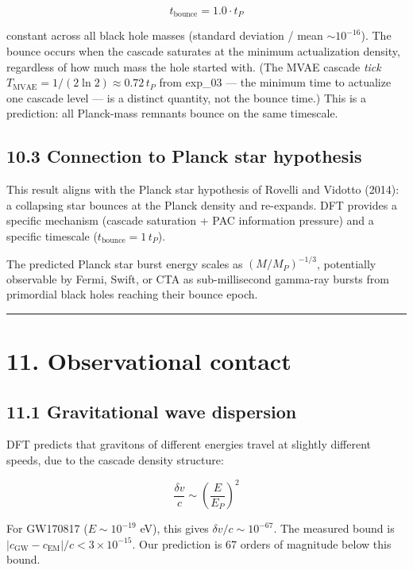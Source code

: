 \documentclass[11pt,a4paper]{article}
\begin{document}
\[t_{\text{bounce}} = 1.0 \cdot t_P\]

constant across all black hole masses (standard deviation / mean $\sim 10^{-16}$). The bounce occurs when the cascade saturates at the minimum actualization density, regardless of how much mass the hole started with. (The MVAE cascade \emph{tick} $T_{\text{MVAE}} = 1/(2\ln 2) \approx 0.72\,t_P$ from exp\_03 — the minimum time to actualize one cascade level — is a distinct quantity, not the bounce time.) This is a prediction: all Planck-mass remnants bounce on the same timescale.

\subsection*{10.3 Connection to Planck star hypothesis}

This result aligns with the Planck star hypothesis of Rovelli and Vidotto (2014): a collapsing star bounces at the Planck density and re-expands. DFT provides a specific mechanism (cascade saturation + PAC information pressure) and a specific timescale ($t_{\text{bounce}} = 1\,t_P$).

The predicted Planck star burst energy scales as $(M/M_P)^{-1/3}$, potentially observable by Fermi, Swift, or CTA as sub-millisecond gamma-ray bursts from primordial black holes reaching their bounce epoch.

\begin{center}\rule{0.5\linewidth}{0.4pt}\end{center}

\section*{11. Observational contact}

\subsection*{11.1 Gravitational wave dispersion}

DFT predicts that gravitons of different energies travel at slightly different speeds, due to the cascade density structure:

\[\frac{\delta v}{c} \sim \left(\frac{E}{E_P}\right)^2\]

For GW170817 ($E \sim 10^{-19}$ eV), this gives $\delta v / c \sim 10^{-67}$. The measured bound is $|c_{\text{GW}} - c_{\text{EM}}|/c < 3 \times 10^{-15}$. Our prediction is 67 orders of magnitude below this bound.
\end{document}
